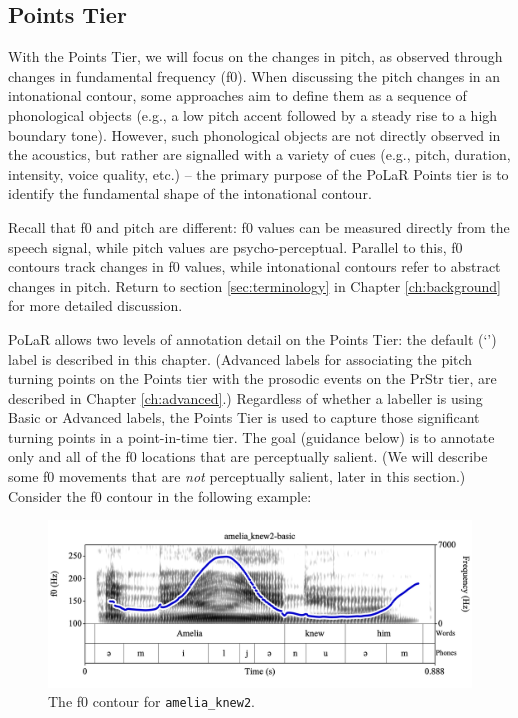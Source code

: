 \documentclass[11pt, twoside]{memoir}
\def\textlabel#1{{\relsize{-.5}\fontspec[Mapping=tex-text]{Roboto Mono}{#1}}}
\begin{document}
\subsection{Points Tier}\label{sec:points}
With the Points Tier, we will focus on the changes in pitch, as observed through changes in fundamental frequency (f0). When discussing the pitch changes in an intonational contour, some approaches aim to define them as a sequence of phonological objects (e.g., a low pitch accent followed by a steady rise to a high boundary tone). However, such phonological objects are not directly observed in the acoustics, but rather are signalled with a variety of cues (e.g., pitch, duration, intensity, voice quality, etc.) – the primary purpose of the PoLaR Points tier is to identify the fundamental shape of the intonational contour.
\begin{infobox}[frametitle=\textbf{A NOTE ON TERMINOLOGY}]
Recall that f0 and pitch are different: f0 values can be measured directly from the speech signal, while pitch values are psycho-perceptual. Parallel to this, f0 contours track changes in f0 values, while intonational contours refer to abstract changes in pitch. Return to section \ref{sec:terminology} in Chapter \ref{ch:background} for more detailed discussion.\label{terminology f0 pitch}
\end{infobox}
PoLaR allows two levels of annotation detail on the Points Tier: the default (‘\textlabel{0}’) label is described in this chapter. (Advanced labels for associating the pitch turning points on the Points tier with the prosodic events on the PrStr tier, are described in Chapter \ref{ch:advanced}.)
Regardless of whether a labeller is using Basic or Advanced labels, the Points Tier is used to capture those significant turning points in a point-in-time tier. The goal (guidance below) is to annotate only and all of the f0 locations that are perceptually salient. (We will describe some f0 movements that are \emph{not} perceptually salient, later in this section.) Consider the f0 contour in the following example:
\begin{figure}[H]
\centering
\includegraphics[width=.875\linewidth]{Points-amelia_knew2-f0.png}
\caption{The f0 contour for \texttt{amelia\_knew2}.
\label{fig:amelia_knew2 f0 contour}
}
\end{figure}
\end{document}
